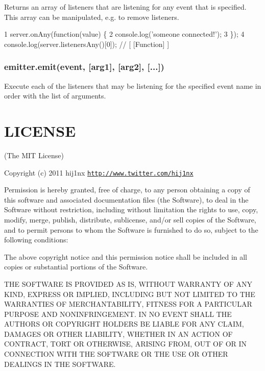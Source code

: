Returns an array of listeners that are listening for any event that is specified. This array can be manipulated, e.\+g. to remove listeners.


\begin{DoxyCode}
1 server.onAny(function(value) \{
2   console.log('someone connected!');
3 \});
4 console.log(server.listenersAny()[0]); // [ [Function] ]
\end{DoxyCode}


\subsubsection*{emitter.\+emit(event, \mbox{[}arg1\mbox{]}, \mbox{[}arg2\mbox{]}, \mbox{[}...\mbox{]})}

Execute each of the listeners that may be listening for the specified event name in order with the list of arguments.

\section*{L\+I\+C\+E\+N\+S\+E}

(The M\+I\+T License)

Copyright (c) 2011 hij1nx \href{http://www.twitter.com/hij1nx}{\tt http\+://www.\+twitter.\+com/hij1nx}

Permission is hereby granted, free of charge, to any person obtaining a copy of this software and associated documentation files (the \textquotesingle{}Software\textquotesingle{}), to deal in the Software without restriction, including without limitation the rights to use, copy, modify, merge, publish, distribute, sublicense, and/or sell copies of the Software, and to permit persons to whom the Software is furnished to do so, subject to the following conditions\+:

The above copyright notice and this permission notice shall be included in all copies or substantial portions of the Software.

T\+H\+E S\+O\+F\+T\+W\+A\+R\+E I\+S P\+R\+O\+V\+I\+D\+E\+D \textquotesingle{}A\+S I\+S\textquotesingle{}, W\+I\+T\+H\+O\+U\+T W\+A\+R\+R\+A\+N\+T\+Y O\+F A\+N\+Y K\+I\+N\+D, E\+X\+P\+R\+E\+S\+S O\+R I\+M\+P\+L\+I\+E\+D, I\+N\+C\+L\+U\+D\+I\+N\+G B\+U\+T N\+O\+T L\+I\+M\+I\+T\+E\+D T\+O T\+H\+E W\+A\+R\+R\+A\+N\+T\+I\+E\+S O\+F M\+E\+R\+C\+H\+A\+N\+T\+A\+B\+I\+L\+I\+T\+Y, F\+I\+T\+N\+E\+S\+S F\+O\+R A P\+A\+R\+T\+I\+C\+U\+L\+A\+R P\+U\+R\+P\+O\+S\+E A\+N\+D N\+O\+N\+I\+N\+F\+R\+I\+N\+G\+E\+M\+E\+N\+T. I\+N N\+O E\+V\+E\+N\+T S\+H\+A\+L\+L T\+H\+E A\+U\+T\+H\+O\+R\+S O\+R C\+O\+P\+Y\+R\+I\+G\+H\+T H\+O\+L\+D\+E\+R\+S B\+E L\+I\+A\+B\+L\+E F\+O\+R A\+N\+Y C\+L\+A\+I\+M, D\+A\+M\+A\+G\+E\+S O\+R O\+T\+H\+E\+R L\+I\+A\+B\+I\+L\+I\+T\+Y, W\+H\+E\+T\+H\+E\+R I\+N A\+N A\+C\+T\+I\+O\+N O\+F C\+O\+N\+T\+R\+A\+C\+T, T\+O\+R\+T O\+R O\+T\+H\+E\+R\+W\+I\+S\+E, A\+R\+I\+S\+I\+N\+G F\+R\+O\+M, O\+U\+T O\+F O\+R I\+N C\+O\+N\+N\+E\+C\+T\+I\+O\+N W\+I\+T\+H T\+H\+E S\+O\+F\+T\+W\+A\+R\+E O\+R T\+H\+E U\+S\+E O\+R O\+T\+H\+E\+R D\+E\+A\+L\+I\+N\+G\+S I\+N T\+H\+E S\+O\+F\+T\+W\+A\+R\+E. 